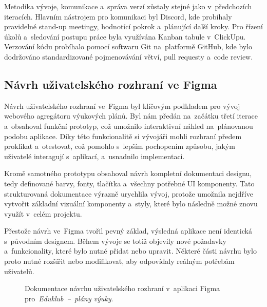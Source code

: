 \documentclass[male,czech,api_bc]{kitheses}
\begin{document}
Metodika vývoje, komunikace a~správa verzí zůstaly stejné jako v~předchozích iteracích. Hlavním nástrojem pro komunikaci byl Discord, kde probíhaly pravidelné stand-up meetingy, hodnotící pokrok a~plánující další kroky. Pro řízení úkolů a~sledování postupu práce byla využívána Kanban tabule v~ClickUpu. Verzování kódu probíhalo pomocí softwaru Git na~platformě GitHub, kde bylo dodržováno standardizované pojmenovávání větví, pull requesty a~code review.

\subsection{Návrh uživatelského rozhraní ve Figma}

Návrh uživatelského rozhraní ve~Figma byl klíčovým podkladem pro vývoj webového agregátoru výukových plánů. Byl nám předán na~začátku třetí iterace a~obsahoval funkční prototyp, což umožnilo interaktivní náhled na~plánovanou podobu aplikace. Díky této funkcionalitě si vývojáři mohli rozhraní předem proklikat a~otestovat, což pomohlo s~lepším pochopením způsobu, jakým uživatelé interagují s~aplikací, a~usnadnilo implementaci.

Kromě samotného prototypu obsahoval návrh kompletní dokumentaci designu, tedy definované barvy, fonty, tlačítka a~všechny potřebné UI komponenty. Tato strukturovaná dokumentace výrazně urychlila vývoj, protože umožnila nejdříve vytvořit základní vizuální komponenty a~styly, které bylo následně možné znovu využít v~celém projektu.

Přestože návrh ve~Figma tvořil pevný základ, výsledná aplikace není identická s~původním designem. Během vývoje se totiž objevily nové požadavky a~funkcionality, které bylo nutné přidat nebo upravit. Některé části návrhu bylo proto nutné rozšířit nebo modifikovat, aby odpovídaly reálným potřebám uživatelů.

\begin{figure}[H]
	\centering
	\caption{Dokumentace návrhu uživatelského rozhraní v~aplikaci Figma pro~\textit{Eduklub~--~plány výuky}.}
	\label{fig:eduklub-navrh-1}
\end{figure}
\end{document}
